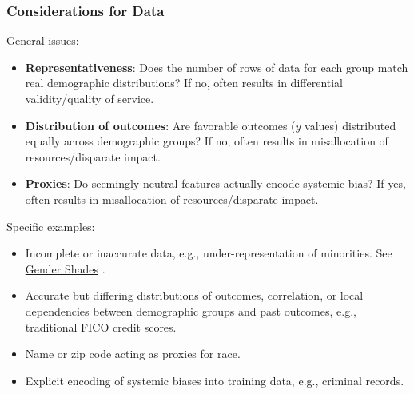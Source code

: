 \documentclass[11pt,aspectratio=169,hyperref={colorlinks}]{beamer}
\begin{document}
		\begin{frame}				
		
			\frametitle{Considerations for Data}

			\noindent \small General issues:\\
			\begin{itemize}\scriptsize
				\item\textbf{Representativeness}: Does the number of rows of data for each group match real demographic distributions? If no, often results in differential validity/quality of service.
				\item \textbf{Distribution of outcomes}: Are favorable outcomes ($y$ values) distributed equally across demographic groups? If no, often results in misallocation of resources/disparate impact. 
				\item \textbf{Proxies}: Do seemingly neutral features actually encode systemic bias? If yes, often results in misallocation of resources/disparate impact.   			
			\end{itemize}
			
			\noindent \small Specific examples:\\
			\begin{itemize}\scriptsize
				\item Incomplete or inaccurate data, e.g., under-representation of minorities. See \href{http://gendershades.org/}{Gender Shades} \cite{gender_shades}.
				\item Accurate but differing distributions of outcomes, correlation, or local dependencies between demographic groups and past outcomes, e.g., traditional FICO credit scores.
				\item Name or zip code acting as proxies for race.
				\item Explicit encoding of systemic biases into training data, e.g., criminal records.
			\end{itemize}

		\end{frame}
\end{document}
